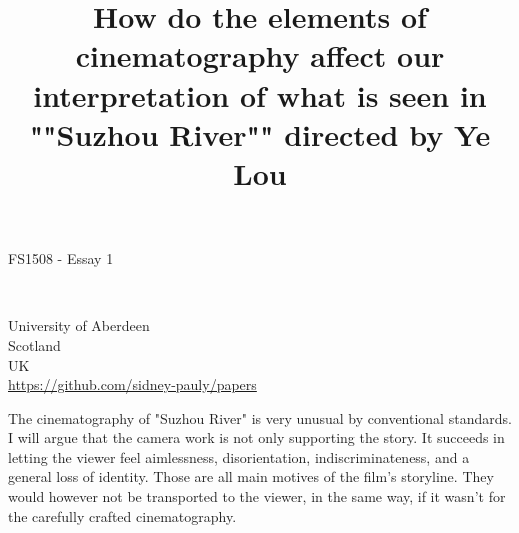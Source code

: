 \documentclass[fleqn,14pt]{article}
\begin{document}
\lstset{
  language=Python,
  basicstyle=\small,          %
  keywordstyle=\bfseries,
  identifierstyle=,           %
  commentstyle=,              %
  stringstyle=\ttfamily,      %
  showstringspaces=false,     %
  numbers=left,
  numberstyle=\tiny,
  numbersep=5pt,
  frame=tb,
}

\title{How do the elements of cinematography affect our interpretation of what is seen in ""Suzhou River"" directed by Ye Lou }
\date{}




\fancyhf{}



\begin{titlepage}
  \begin{center}
    \Large
    \textbf{\thetitle}
        
    \vspace{0.4cm}
    \large
    FS1508 - Essay 1
        
    \vspace{0.4cm}
    \textbf{\theauthor}\\
    \textbf{\theuoastudentid}

       
    \vfill


    University of Aberdeen\\
    Scotland\\
    UK\\
    \thedate
    \vspace{0.4cm}
    \url{https://github.com/sidney-pauly/papers}
  \end{center}
\end{titlepage}


The cinematography of "Suzhou River" is very unusual by conventional standards. I will argue that
the camera work is not only supporting the story. It succeeds in letting the viewer feel
aimlessness, disorientation, indiscriminateness, and a general loss of identity. Those are all main
motives of the film's storyline. They would however not be transported to the viewer, in the same way,
if it wasn't for the carefully crafted cinematography. 
\end{document}
